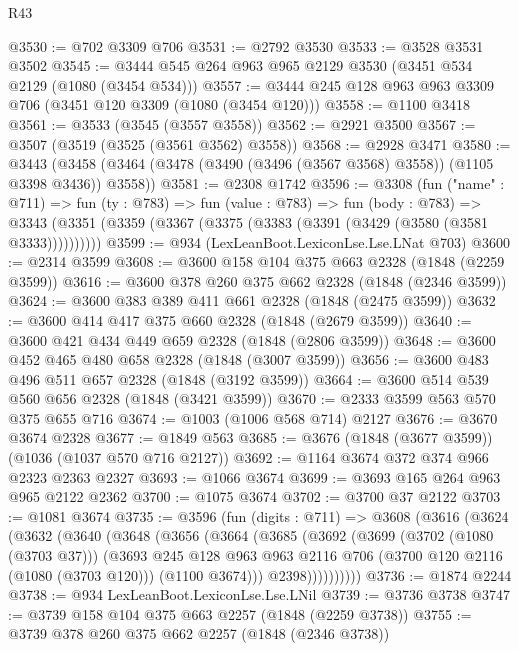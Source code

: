 \begin{lexlean}{R43}
\begin{coremodule}
@3530 := @702 @3309 @706
@3531 := @2792 @3530
@3533 := @3528 @3531 @3502
@3545 := @3444 @545 @264 @963 @965 @2129 @3530 (@3451 @534 @2129 (@1080 (@3454 @534)))
@3557 := @3444 @245 @128 @963 @963 @3309 @706 (@3451 @120 @3309 (@1080 (@3454 @120)))
@3558 := @1100 @3418
@3561 := @3533 (@3545 (@3557 @3558))
@3562 := @2921 @3500
@3567 := @3507 (@3519 (@3525 (@3561 @3562) @3558))
@3568 := @2928 @3471
@3580 := @3443 (@3458 (@3464 (@3478 (@3490 (@3496 (@3567 @3568) @3558)) (@1105 @3398 @3436)) @3558))
@3581 := @2308 @1742
@3596 := @3308
    (fun ("name" : @711) =>
    fun (ty : @783) =>
    fun (value : @783) =>
    fun (body : @783) =>
    @3343 (@3351 (@3359 (@3367 (@3375 (@3383 (@3391 (@3429 (@3580 (@3581 @3333))))))))))
@3599 := @934 (LexLeanBoot.LexiconLse.Lse.LNat @703)
@3600 := @2314 @3599
@3608 := @3600 @158 @104 @375 @663 @2328 (@1848 (@2259 @3599))
@3616 := @3600 @378 @260 @375 @662 @2328 (@1848 (@2346 @3599))
@3624 := @3600 @383 @389 @411 @661 @2328 (@1848 (@2475 @3599))
@3632 := @3600 @414 @417 @375 @660 @2328 (@1848 (@2679 @3599))
@3640 := @3600 @421 @434 @449 @659 @2328 (@1848 (@2806 @3599))
@3648 := @3600 @452 @465 @480 @658 @2328 (@1848 (@3007 @3599))
@3656 := @3600 @483 @496 @511 @657 @2328 (@1848 (@3192 @3599))
@3664 := @3600 @514 @539 @560 @656 @2328 (@1848 (@3421 @3599))
@3670 := @2333 @3599 @563 @570 @375 @655 @716
@3674 := @1003 (@1006 @568 @714) @2127
@3676 := @3670 @3674 @2328
@3677 := @1849 @563
@3685 := @3676 (@1848 (@3677 @3599)) (@1036 (@1037 @570 @716 @2127))
@3692 := @1164 @3674 @372 @374 @966 @2323 @2363 @2327
@3693 := @1066 @3674
@3699 := @3693 @165 @264 @963 @965 @2122 @2362
@3700 := @1075 @3674
@3702 := @3700 @37 @2122
@3703 := @1081 @3674
@3735 := @3596
    (fun (digits : @711) =>
    @3608
      (@3616
        (@3624
          (@3632
            (@3640
              (@3648
                (@3656
                  (@3664
                    (@3685
                      (@3692
                        (@3699
                          (@3702 (@1080 (@3703 @37)))
                          (@3693
                            @245
                            @128
                            @963
                            @963
                            @2116
                            @706
                            (@3700 @120 @2116 (@1080 (@3703 @120)))
                            (@1100 @3674)))
                        @2398))))))))))
@3736 := @1874 @2244
@3738 := @934 LexLeanBoot.LexiconLse.Lse.LNil
@3739 := @3736 @3738
@3747 := @3739 @158 @104 @375 @663 @2257 (@1848 (@2259 @3738))
@3755 := @3739 @378 @260 @375 @662 @2257 (@1848 (@2346 @3738))

\end{coremodule}
\end{lexlean}
